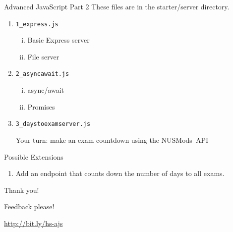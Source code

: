 \documentclass{beamer}
\begin{document}
\begin{frame}[fragile]{Advanced JavaScript Part 2}
    These files are in the starter/server directory.
    \begin{enumerate}
        \item \lstinline{1_express.js}
            \begin{enumerate}[(i)]
                \item Basic Express server
                \item File server
            \end{enumerate}
        \item \lstinline{2_asyncawait.js}
            \begin{enumerate}[(i)]
                \item async/await
                \item Promises
            \end{enumerate}
        \item
            \lstinline{3_daystoexamserver.js}

            Your turn: make an exam countdown using the NUSMods~API
    \end{enumerate}
\end{frame}

\begin{frame}{Possible Extensions}
    \begin{enumerate}
        \item Add an endpoint that counts down the number of days to all exams.
    \end{enumerate}
\end{frame}

\begin{frame}
    \begin{center}
        \vspace{0.1\textheight}

        {\Huge Thank you!}

        {\Large Feedback please!}


        \href{http://bit.ly/hs-ajs}{http://bit.ly/hs-ajs}
    \end{center}
\end{frame}
\end{document}
